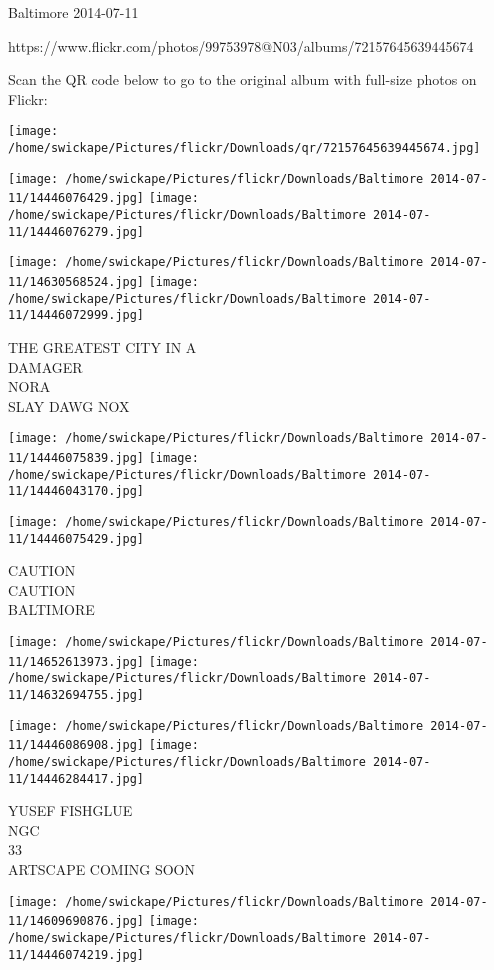 \documentclass[10pt,letterpaper]{article}
\begin{document}
Baltimore 2014-07-11

https://www.flickr.com/photos/99753978@N03/albums/72157645639445674

Scan the QR code below to go to the original album with full-size photos on Flickr:

\texttt{[image: /home/swickape/Pictures/flickr/Downloads/qr/72157645639445674.jpg]}
\pagebreak

\texttt{[image: /home/swickape/Pictures/flickr/Downloads/Baltimore 2014-07-11/14446076429.jpg]}
\texttt{[image: /home/swickape/Pictures/flickr/Downloads/Baltimore 2014-07-11/14446076279.jpg]}

\texttt{[image: /home/swickape/Pictures/flickr/Downloads/Baltimore 2014-07-11/14630568524.jpg]}
\texttt{[image: /home/swickape/Pictures/flickr/Downloads/Baltimore 2014-07-11/14446072999.jpg]}

THE GREATEST CITY IN A\\
DAMAGER\\
NORA\\
SLAY DAWG NOX
\pagebreak

\texttt{[image: /home/swickape/Pictures/flickr/Downloads/Baltimore 2014-07-11/14446075839.jpg]}
\texttt{[image: /home/swickape/Pictures/flickr/Downloads/Baltimore 2014-07-11/14446043170.jpg]}

\vspace{0.25in}
\texttt{[image: /home/swickape/Pictures/flickr/Downloads/Baltimore 2014-07-11/14446075429.jpg]}

CAUTION\\
CAUTION\\
BALTIMORE
\pagebreak

\texttt{[image: /home/swickape/Pictures/flickr/Downloads/Baltimore 2014-07-11/14652613973.jpg]}
\texttt{[image: /home/swickape/Pictures/flickr/Downloads/Baltimore 2014-07-11/14632694755.jpg]}

\texttt{[image: /home/swickape/Pictures/flickr/Downloads/Baltimore 2014-07-11/14446086908.jpg]}
\texttt{[image: /home/swickape/Pictures/flickr/Downloads/Baltimore 2014-07-11/14446284417.jpg]}

YUSEF FISHGLUE\\
NGC\\
33\\
ARTSCAPE COMING SOON
\pagebreak

\texttt{[image: /home/swickape/Pictures/flickr/Downloads/Baltimore 2014-07-11/14609690876.jpg]}
\texttt{[image: /home/swickape/Pictures/flickr/Downloads/Baltimore 2014-07-11/14446074219.jpg]}
\end{document}
